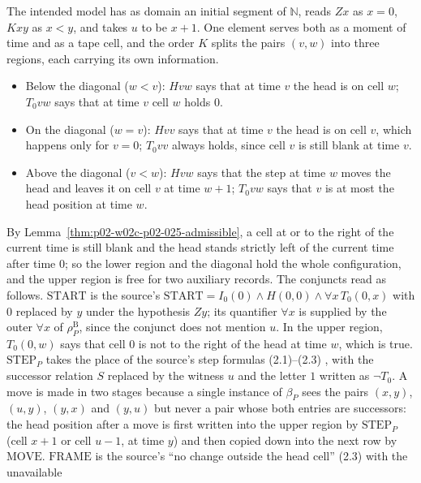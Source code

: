 The intended model has as domain an initial segment of \(\mathbb N\), reads
\(Zx\) as \(x=0\), \(Kxy\) as \(x<y\), and takes \(u\) to be \(x+1\).  One
element serves both as a moment of time and as a tape cell, and the
order \(K\) splits the pairs \((v,w)\) into three regions, each carrying its own
information.
\begin{itemize}
\item Below the diagonal (\(w<v\)): \(Hvw\) says that at time \(v\) the head is
  on cell \(w\); \(T_0vw\) says that at time \(v\) cell \(w\) holds \(0\).
\item On the diagonal (\(w=v\)): \(Hvv\) says that at time \(v\) the head is on
  cell \(v\), which happens only for \(v=0\); \(T_0vv\) always holds, since cell
  \(v\) is still blank at time \(v\).
\item Above the diagonal (\(v<w\)): \(Hvw\) says that the step at time \(w\)
  moves the head and leaves it on cell \(v\) at time \(w+1\); \(T_0vw\) says
  that \(v\) is at most the head position at time \(w\).
\end{itemize}
By Lemma~\ref{thm:p02-w02c-p02-025-admissible}, a cell at or to the right of
the current time is still blank and the head stands strictly left of the
current time after time \(0\); so the lower region and the diagonal hold the
whole configuration, and the upper region is free for two auxiliary records.
The conjuncts read as follows.  \(\mathrm{START}\) is the source's
\(\mathrm{START}=I_0(0)\land H(0,0)\land\forall x\,T_0(0,x)\)
\cite[Sect.~2.1.1, p.~22]{BorgerGradelGurevich1997} with \(0\) replaced by
\(y\) under the hypothesis \(Zy\); its quantifier \(\forall x\) is supplied
by the outer \(\forall x\) of \(\rho^{\mathrm B}_P\), since the conjunct does
not mention \(u\).  In the upper region, \(T_0(0,w)\) says that cell \(0\) is
not to the right of the head at time \(w\), which is true.  \(\mathrm{STEP}_P\)
takes the place of the source's step formulas (2.1)--(2.3)
\cite[Sect.~2.1.1, pp.~20--21]{BorgerGradelGurevich1997}, with the successor
relation \(S\) replaced by the witness \(u\) and the letter \(1\) written as
\(\neg T_0\).  A move is made in two stages because a
single instance of \(\beta_P\) sees the pairs \((x,y)\), \((u,y)\), \((y,x)\)
and \((y,u)\) but never a pair whose both entries are successors: the head
position after a move is first written into the upper region by
\(\mathrm{STEP}_P\) (cell \(x+1\) or cell \(u-1\), at time \(y\)) and then
copied down into the next row by \(\mathrm{MOVE}\).  \(\mathrm{FRAME}\) is
the source's ``no change outside the head cell'' (2.3) with the unavailable
